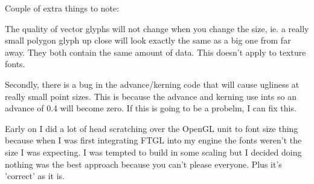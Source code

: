 Couple of extra things to note:


\begin{DoxyItemize}
\item The quality of vector glyphs will not change when you change the size, ie. a really small polygon glyph up close will look exactly the same as a big one from far away. They both contain the same amount of data. This doesn't apply to texture fonts.
\end{DoxyItemize}


\begin{DoxyItemize}
\item Secondly, there is a bug in the advance/kerning code that will cause ugliness at really small point sizes. This is because the advance and kerning use ints so an advance of 0.4 will become zero. If this is going to be a probelm, I can fix this.
\end{DoxyItemize}

Early on I did a lot of head scratching over the OpenGL unit to font size thing because when I was first integrating FTGL into my engine the fonts weren't the size I was expecting. I was tempted to build in some scaling but I decided doing nothing was the best approach because you can't please everyone. Plus it's 'correct' as it is. 
